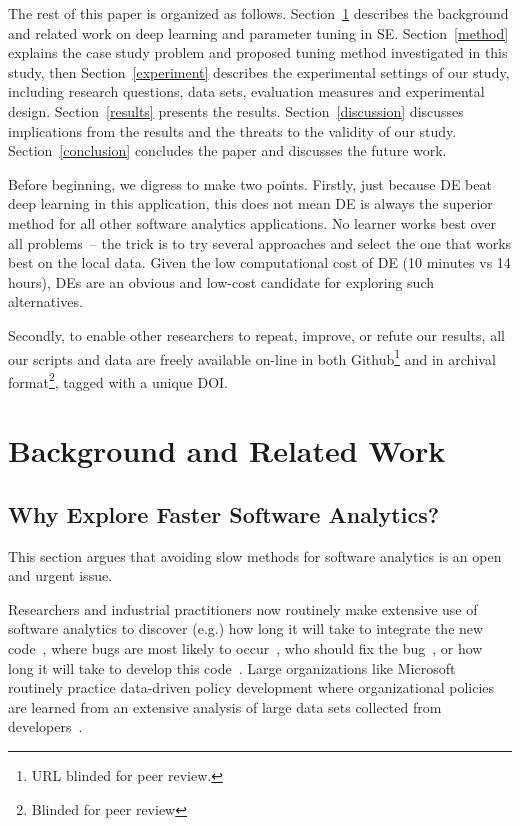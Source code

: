 \documentclass[sigconf,review, anonymous]{acmart}
\theoremstyle{break}
\begin{document}
The rest of this paper is organized as follows. Section~\ref{background} describes the background and related work on deep learning and parameter tuning in SE. Section~\ref{method} explains the case study problem and proposed tuning method investigated in this study, then Section~\ref{experiment} describes the
experimental settings of our study, including research questions, data sets, evaluation measures and experimental design.
Section~\ref{results} presents the results. Section~\ref{discussion} discusses implications from the results and the threats to the validity of our study. Section~\ref{conclusion} concludes the paper and discusses the future work.

Before beginning, we digress to make two points.
Firstly, just because DE beat deep learning
in this application, this does not mean DE is always the superior method for all other software analytics applications. No learner works best over all problems~\cite{wolpert1996lack}-- the trick is to try several approaches and select the one that works best on the local data. Given the low computational cost of DE (10 minutes vs 14 hours), DEs are an obvious and low-cost candidate for exploring such alternatives. 

Secondly, to enable other researchers to repeat, improve, or
refute our results, all our scripts and data are 
freely available on-line in both
Github\footnote{URL blinded for 
peer review.} and in archival format\footnote{Blinded for peer review}, tagged with a unique DOI.



\section{Background and Related Work}\label{background}

\subsection{Why Explore Faster Software Analytics?}
This section argues that
avoiding slow methods for software analytics is an 
open and urgent issue.

Researchers and industrial practitioners now routinely make extensive use of software analytics to discover (e.g.) how long it will take to integrate the new code~\cite{czerwonka2011crane}, where bugs are most likely to occur~\cite{ostrand2004bugs}, who should fix the bug~\cite{anvik2006should}, or how long it will take to develop this code~\cite{kocaguneli2012value,kocaguneli2012exploiting,molokken2003review}.  Large organizations like Microsoft routinely practice data-driven policy development where organizational policies are learned from an extensive analysis of large data sets collected from developers~\cite{begel2014analyze,theisen2015approximating}.
\end{document}
